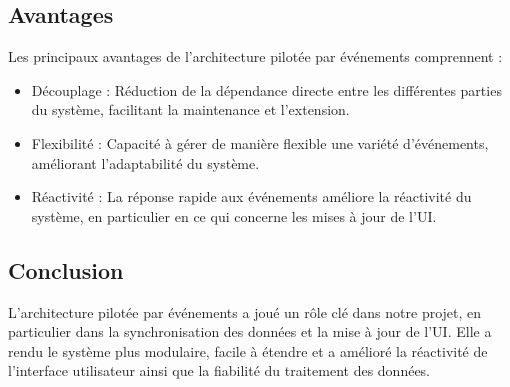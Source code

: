 \documentclass{article}
\begin{document}
\subsection{Avantages}
Les principaux avantages de l'architecture pilotée par événements comprennent :
\begin{itemize}
    \item Découplage : Réduction de la dépendance directe entre les différentes parties du système, facilitant la maintenance et l'extension.
    \item Flexibilité : Capacité à gérer de manière flexible une variété d'événements, améliorant l'adaptabilité du système.
    \item Réactivité : La réponse rapide aux événements améliore la réactivité du système, en particulier en ce qui concerne les mises à jour de l'UI.
\end{itemize}
\subsection{Conclusion}
L'architecture pilotée par événements a joué un rôle clé dans notre projet, en particulier dans la synchronisation des données et la mise à jour de l'UI. Elle a rendu le système plus modulaire, facile à étendre et a amélioré la réactivité de l'interface utilisateur ainsi que la fiabilité du traitement des données.
    
\end{document}
